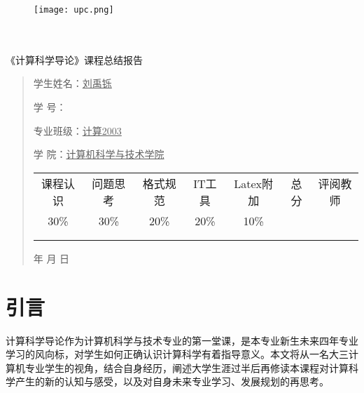 \documentclass{article}
\renewcommand{\today}{\number\year 年 \number\month 月 \number\day 日}
\begin{document}
\begin{figure}
    \centering
    \texttt{[image: upc.png]}

    \label{figupc}
\end{figure}

	\begin{center}
		\quad \\
		\quad \\
		\heiti \fontsize{45}{17} \quad \quad \quad 
		\vskip 1.5cm
		\heiti {} 《计算科学导论》课程总结报告
	\end{center}
	\vskip 2.0cm
		
	\begin{quotation}
		\doublespacing
		
        \par\setlength\parindent{7em}
		\quad 

		学生姓名：\underline{\qquad  刘禹铄 \qquad \qquad}

		学\hspace{0.61cm} 号：\underline{\quad\qquad}
		
		专业班级：\underline{\qquad 计算2003 \quad\qquad  }
		
        学\hspace{0.61cm} 院：\underline{计算机科学与技术学院}
		\vskip 2cm
		\centering
		\begin{table}[h]
            \centering 
            \begin{tabular}{|c|c|c|c|c|c|c|}
                \hline
                课程认识 & 问题思 考 & 格式规范  & IT工具  & Latex附加  & 总分 & 评阅教师 \\
                30\% & 30\% & 20\% & 20\% & 10\% &  &  \\
                \hline
                 & & & & & &\\
                & & & & & &\\
                \hline
            \end{tabular}
        \end{table}
		\vskip 2cm
		\today
	\end{quotation}

\thispagestyle{empty}
\newpage
\setcounter{page}{1}
\section{引言}
计算科学导论作为计算机科学与技术专业的第一堂课，是本专业新生未来四年专业学习的风向标，对学生如何正确认识计算科学有着指导意义。本文将从一名大三计算机专业学生的视角，结合自身经历，阐述大学生涯过半后再修读本课程对计算科学产生的新的认知与感受，以及对自身未来专业学习、发展规划的再思考。
\end{document}
